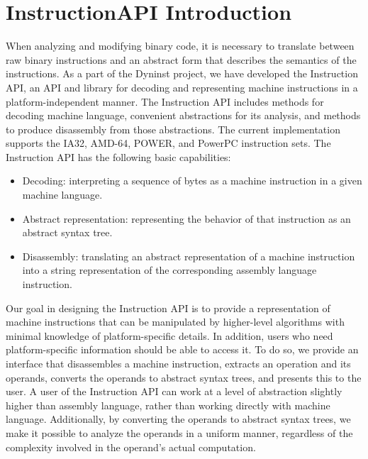 \section{InstructionAPI Introduction}
\label{sec:intro}

When analyzing and modifying binary code, it is necessary to translate between
raw binary instructions and an abstract form that describes the semantics of the
instructions. As a part of the Dyninst project, we have developed the
Instruction API, an API and library for decoding and representing machine
instructions in a platform-\/independent manner. The Instruction API includes
methods for decoding machine language, convenient abstractions for its analysis,
and methods to produce disassembly from those abstractions. The current
implementation supports the IA32, AMD-\/64, POWER, and PowerPC instruction sets.
The Instruction API has the following basic capabilities:

\begin{itemize}
\item Decoding: interpreting a sequence of bytes as a machine instruction in a given machine language.
\item Abstract representation: representing the behavior of that instruction as an abstract syntax tree.
\item Disassembly: translating an abstract representation of a machine instruction into a string representation of the corresponding assembly language instruction.
\end{itemize}

Our goal in designing the Instruction API is to provide a representation of
machine instructions that can be manipulated by higher-\/level algorithms with
minimal knowledge of platform-\/specific details. In addition, users who need
platform-\/specific information should be able to access it. To do so, we
provide an interface that disassembles a machine instruction, extracts an
operation and its operands, converts the operands to abstract syntax trees, and
presents this to the user. A user of the Instruction API can work at a level of
abstraction slightly higher than assembly language, rather than working directly
with machine language. Additionally, by converting the operands to abstract
syntax trees, we make it possible to analyze the operands in a uniform manner,
regardless of the complexity involved in the operand's actual computation.  
